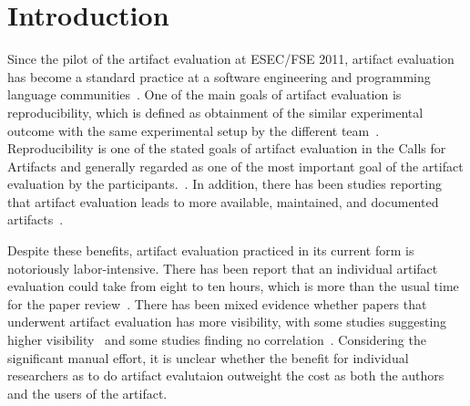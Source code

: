 \section{Introduction}
\label{s:introduction}

Since the pilot of the artifact evaluation at ESEC/FSE 2011, artifact evaluation has become a standard practice at a software engineering and programming language communities~\cite{DBLP:journals/cacm/KrishnamurthiV15}.
One of the main goals of artifact evaluation is reproducibility, which is defined as obtainment of the similar experimental outcome with the same experimental setup by the different team~\cite{acm-artifact-badging-v1_1}.
Reproducibility is one of the stated goals of artifact evaluation in the Calls for Artifacts and generally regarded as one of the most important goal of the artifact evaluation by the participants.~\cite{DBLP:conf/sigsoft/Hermann0S20}.
In addition, there has been studies reporting that artifact evaluation leads to more available, maintained, and documented artifacts~\cite{DBLP:conf/se/0001T0C0H024}.

Despite these benefits, artifact evaluation practiced in its current form is notoriously labor-intensive.
There has been report that an individual artifact evaluation could take from eight to ten hours, which is more than the usual time for the paper review~\cite{DBLP:journals/ieeesp/Hermann22}.
There has been mixed evidence whether papers that underwent artifact evaluation has more visibility, with some studies suggesting higher visibility~\cite{DBLP:journals/ese/HeumullerNKO20} and some studies finding no correlation~\cite{DBLP:conf/se/0001T0C0H024}.
Considering the significant manual effort, it is unclear whether the benefit for individual researchers as to do artifact evalutaion outweight the cost as both the authors and the users of the artifact.

